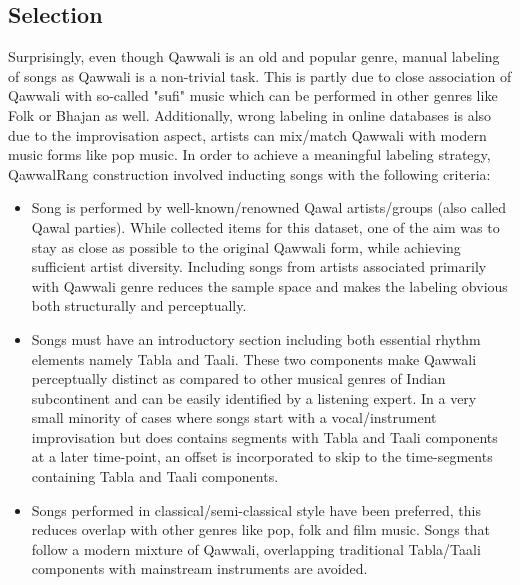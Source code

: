 \documentclass{article}
\begin{document}
\subsection{Selection}
Surprisingly, even though Qawwali is an old and popular genre, manual labeling of songs as Qawwali is a non-trivial task. This is partly due to close association of Qawwali with so-called "sufi" music which can be performed in other genres like Folk or Bhajan as well. Additionally, wrong labeling in online databases is also due to the improvisation aspect, artists can mix/match Qawwali with modern music forms like pop music. In order to achieve a meaningful labeling strategy, QawwalRang construction involved inducting songs with the following criteria:
\begin{itemize}
\item Song is performed by well-known/renowned Qawal artists/groups (also called Qawal parties). While collected items for this dataset, one of the aim was to stay as close as possible to the original Qawwali form, while achieving sufficient artist diversity. Including songs from artists associated primarily with Qawwali genre reduces the sample space and makes the labeling obvious both structurally and perceptually.
\item Songs must have an introductory section including both essential rhythm elements namely Tabla and Taali. These two components make Qawwali perceptually distinct as compared to other musical genres of Indian subcontinent and can be easily identified by a listening expert. In a very small minority of cases where songs start with a vocal/instrument improvisation but does contains segments with Tabla and Taali components at a later time-point, an offset is incorporated to skip to the time-segments containing Tabla and Taali components.
\item Songs performed in classical/semi-classical style have been preferred, this reduces overlap with other genres like pop, folk and film music. Songs that follow a modern mixture of Qawwali, overlapping traditional Tabla/Taali components with mainstream instruments are avoided.
\end{itemize}
\end{document}
